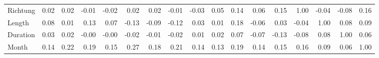 \begin{tabular}{lrrrrrrrrrrrrrrrr}
Richtung &  0.02 &  0.02 & -0.01 & -0.02 &   0.02 &   0.02 & -0.01 &  -0.03 &   0.05 & 0.14 &  0.06 &    0.15 &      1.00 &   -0.04 &     -0.08 &   0.16 \\
Length   &  0.08 &  0.01 &  0.13 &  0.07 &  -0.13 &  -0.09 & -0.12 &   0.03 &   0.01 & 0.18 & -0.06 &    0.03 &     -0.04 &    1.00 &      0.08 &   0.09 \\
Duration &  0.03 &  0.02 & -0.00 & -0.00 &  -0.02 &  -0.01 & -0.02 &   0.01 &   0.02 & 0.07 & -0.07 &   -0.13 &     -0.08 &    0.08 &      1.00 &   0.06 \\
Month    &  0.14 &  0.22 &  0.19 &  0.15 &   0.27 &   0.18 &  0.21 &   0.14 &   0.13 & 0.19 &  0.14 &    0.15 &      0.16 &    0.09 &      0.06 &   1.00 \\
\bottomrule
\end{tabular}
